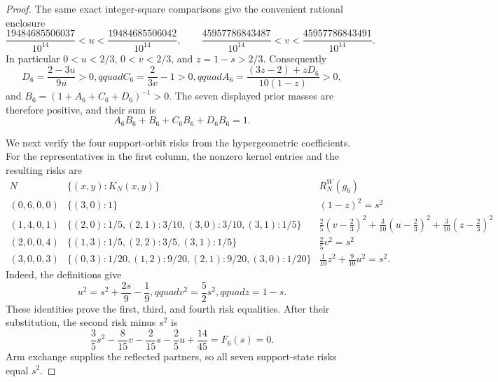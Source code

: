 \documentclass{article}
\begin{document}
\begin{proof}
The same exact integer-square comparisons give the convenient rational enclosure
\[
 \frac{19484685506037}{10^{14}}<u<\frac{19484685506042}{10^{14}},
 \qquad
 \frac{45957786843487}{10^{14}}<v<\frac{45957786843491}{10^{14}}.
\]
In particular \(0<u<2/3\), \(0<v<2/3\), and \(z=1-s>2/3\).  Consequently
\[
 D_6=\frac{2-3u}{9u}>0,qquad
 C_6=\frac2{3v}-1>0,qquad
 A_6=\frac{(3z-2)+zD_6}{10(1-z)}>0,
\]
and \(B_6=(1+A_6+C_6+D_6)^{-1}>0\).  The seven displayed prior masses are therefore positive, and their sum is
\[
 A_6B_6+B_6+C_6B_6+D_6B_6=1.
\]

We next verify the four support-orbit risks from the hypergeometric coefficients.  For the representatives in the first column, the nonzero kernel entries and the resulting risks are
\[
\begin{array}{c|c|c}
N&\{(x,y):K_N(x,y)\}&R_N^W(g_6)\\ \hline
(0,6,0,0)&\{(3,0):1\}&(1-z)^2=s^2\\
(1,4,0,1)&\{(2,0):1/5,(2,1):3/10,(3,0):3/10,(3,1):1/5\}
&\frac25(v-\frac23)^2+\frac3{10}(u-\frac23)^2+\frac3{10}(z-\frac23)^2\\
(2,0,0,4)&\{(1,3):1/5,(2,2):3/5,(3,1):1/5\}&\frac25v^2=s^2\\
(3,0,0,3)&\{(0,3):1/20,(1,2):9/20,(2,1):9/20,(3,0):1/20\}
&\frac1{10}z^2+\frac9{10}u^2=s^2.
\end{array}
\]
Indeed, the definitions give
\[
 u^2=s^2+\frac{2s}{9}-\frac19,qquad
 v^2=\frac52s^2,qquad z=1-s.
\]
These identities prove the first, third, and fourth risk equalities.  After their substitution, the second risk minus \(s^2\) is
\[
 \frac35s^2-\frac8{15}v-\frac2{15}s-\frac25u+\frac{14}{45}
 =F_6(s)=0.
\]
Arm exchange supplies the reflected partners, so all seven support-state risks equal \(s^2\).


\end{proof}
\end{document}
